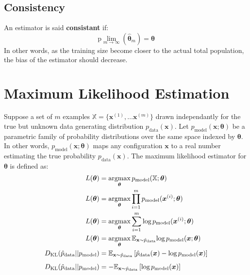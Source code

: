 \documentclass[12pt]{report}
\newcommand{\argmax}{\operatornamewithlimits{argmax}}
\begin{document}
        \subsection{Consistency}
            An estimator is said \textbf{consistant} if:
            \begin{equation}
                \text{p}\lim_{m \rightarrow \infty}(\hat{\boldsymbol{\theta}}_m) = \boldsymbol{\theta}
            \end{equation}
            In other words, as the training size become closer to the actual total population, the bias of the estimator should decrease.
        \section{Maximum Likelihood Estimation}
            Suppose a set of $m$ examples $\mathbb{X} = \{\boldsymbol{x}^{(1)}, \dots \boldsymbol{x}^{(m)}\}$ drawn independantly for the true but unknown data generating distribution $p_{\text{data}}(\boldsymbol{x})$.
            Let $p_{\text{model}}(\boldsymbol{\mathbf{x}};\boldsymbol{\theta})$ be a parametric family of probability distributions over the same space indexed by $\boldsymbol{\theta}$. In other words, $p_{\text{model}}(\boldsymbol{x};\boldsymbol{\theta})$ maps any configuration $\boldsymbol{x}$ to a real number estimating the true probability $p_{\text{data}}(\boldsymbol{x})$. The maximum likelihood estimator for $\boldsymbol{\theta}$ is defined as:
            \begin{align}
                L(\boldsymbol{\theta}) &= \argmax_{\boldsymbol{\theta}}p_{\text{model}}(\mathbb{X};\boldsymbol{\theta}) \label{eq:1}\\
                L(\boldsymbol{\theta}) &= \argmax_{\boldsymbol{\theta}}\prod_{i=1}^{m}{p_{\text{model}}(\boldsymbol{x}^{(i)};\boldsymbol{\theta})} \label{eq:2}\\
                L(\boldsymbol{\theta}) &= \argmax_{\boldsymbol{\theta}}\sum_{i=1}^{m}{\text{log}\,p_{\text{model}}(\boldsymbol{x}^{(i)};\boldsymbol{\theta})} \label{eq:3}\\
                L(\boldsymbol{\theta}) &= \argmax_{\boldsymbol{\theta}}\mathbb{E}_{\mathbf{x}\sim \hat{p}_{\text{data}}}\text{log}\,p_{\text{model}}(\boldsymbol{x};\boldsymbol{\theta}) \label{eq:4}\\
                D_{\text{KL}}(\hat{p}_{\text{data}}||p_{\text{model}}) &= \mathbb{E}_{\mathbf{x}\sim \hat{p}_{\text{data}}}\left[\hat{p}_{\text{data}}(\boldsymbol{x}) - \text{log}\,p_{\text{model}}(\boldsymbol{x})\right] \label{eq:5} \\[5pt]
                D_{\text{KL}}(\hat{p}_{\text{data}}||p_{\text{model}}) &= -\mathbb{E}_{\mathbf{x}\sim \hat{p}_{\text{data}}}\left[\text{log}\,p_{\text{model}}(\boldsymbol{x})\right] \label{eq:6}
            \end{align}
\end{document}
